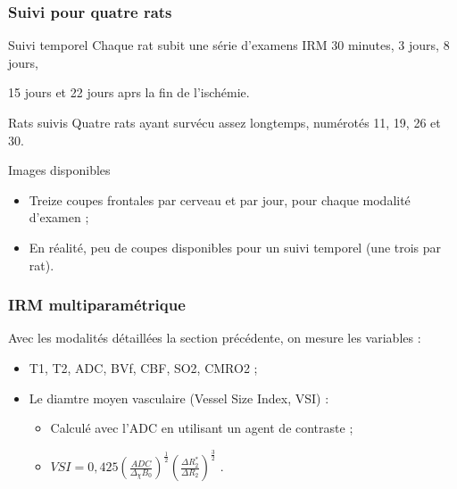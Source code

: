 \subsubsection{Suivi pour quatre rats}

\begin{frame}
%
\begin{block}{Suivi temporel}
Chaque rat subit une s\'erie d'examens IRM 30 minutes, 3 jours, 8 jours,

\par
15 jours et 22 jours aprs la fin de l'isch\'emie.
\end{block}

\pause
\begin{block}{Rats suivis}
Quatre rats ayant surv\'ecu assez longtemps, num\'erot\'es 11, 19, 26 et 30.
\end{block}

\pause
\begin{block}{Images disponibles}
\begin{itemize}
\item<+-> Treize coupes frontales par cerveau et par jour, pour chaque modalit\'e d'examen ;
\item<+-> En r\'ealit\'e, peu de coupes disponibles pour un suivi temporel (une  trois par rat).
\end{itemize}
\end{block}
%
\end{frame}


\begin{frame}
\frametitle{IRM multiparam\'etrique}
Avec les modalit\'es d\'etaill\'ees  la section pr\'ec\'edente, on mesure les variables :

\pause
\begin{itemize}
\item<+-> T1, T2, ADC, BVf, CBF, SO2, CMRO2 ;
\item<+-> Le diamtre moyen vasculaire (Vessel Size Index, VSI) :
\begin{itemize}
\item<+-> Calcul\'e avec l'ADC en utilisant un agent de contraste ;
\item<+-> $VSI = 0,425\left(\frac{ADC}{\Delta_{\chi}B_0}\right)^{\frac{1}{2}}\left(\frac{\Delta R_2^{\ast}}{\Delta R_2}\right)^{\frac{3}{2}}$ \cite{Lem_PHD_10}.
\end{itemize}
\end{itemize}
\end{frame}







